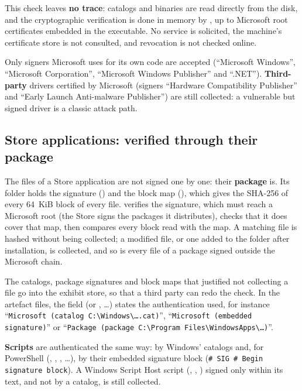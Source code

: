 \documentclass[11pt,a4paper,oneside]{report}
\begin{document}
This check leaves \textbf{no trace}: catalogs and binaries are read directly
from the disk, and the cryptographic verification is done in memory by \wac{},
up to Microsoft root certificates embedded in the executable. No service is
solicited, the machine's certificate store is not consulted, and revocation is
not checked online.

Only signers Microsoft uses for its own code are accepted (``Microsoft
Windows'', ``Microsoft Corporation'', ``Microsoft Windows Publisher'' and
``.NET''). \textbf{Third-party}
drivers certified by Microsoft (signers ``Hardware Compatibility Publisher'' and
``Early Launch Anti-malware Publisher'') are still collected: a vulnerable but
signed driver is a classic attack path.

\subsection*{Store applications: verified through their package}

The files of a Store application are not signed one by one: their
\textbf{package} is. Its folder holds the signature ()
and the block map (), which gives the SHA-256 of every
64~KiB block of every file. \wac{} verifies the signature, which must reach a
Microsoft root (the Store signs the packages it distributes), checks that it
does cover that map, then compares every block read with the map. A matching
file is hashed without being collected; a modified file, or one added to the
folder after installation, is collected, and so is every file of a package
signed outside the Microsoft chain.

The catalogs, package signatures and block maps that justified not collecting a
file go into the exhibit store, so that a third party can redo the check. In
the artefact files, the  field (or ,
\ldots) states the authentication used, for instance
``\texttt{Microsoft (catalog C:\textbackslash{}Windows\textbackslash{}\ldots.cat)}'',
``\texttt{Microsoft (embedded signature)}'' or
``\texttt{Package (package C:\textbackslash{}Program Files\textbackslash{}WindowsApps\textbackslash{}\ldots)}''.

\textbf{Scripts} are authenticated the same way: by Windows' catalogs and, for
PowerShell (, , ,
\ldots), by their embedded signature block
(\texttt{\# SIG \# Begin signature block}). A Windows Script Host script
(, , ) signed only within its text, and
not by a catalog, is still collected.
\end{document}
